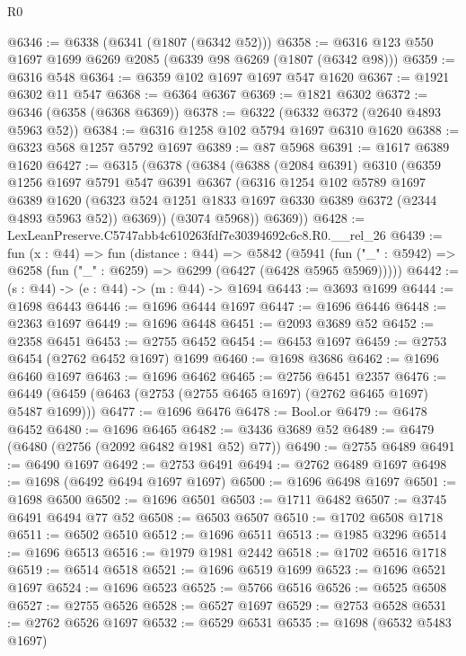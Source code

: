 \begin{lexlean}{R0}
\begin{coremodule}
@6346 := @6338 (@6341 (@1807 (@6342 @52)))
@6358 := @6316 @123 @550 @1697 @1699 @6269 @2085 (@6339 @98 @6269 (@1807 (@6342 @98)))
@6359 := @6316 @548
@6364 := @6359 @102 @1697 @1697 @547 @1620
@6367 := @1921 @6302 @11 @547
@6368 := @6364 @6367
@6369 := @1821 @6302
@6372 := @6346 (@6358 (@6368 @6369))
@6378 := @6322 (@6332 @6372 (@2640 @4893 @5963 @52))
@6384 := @6316 @1258 @102 @5794 @1697 @6310 @1620
@6388 := @6323 @568 @1257 @5792 @1697
@6389 := @87 @5968
@6391 := @1617 @6389 @1620
@6427 := @6315
    (@6378
      (@6384
        (@6388
          (@2084 @6391)
          @6310
          (@6359
            @1256
            @1697
            @5791
            @547
            @6391
            @6367
            (@6316
              @1254
              @102
              @5789
              @1697
              @6389
              @1620
              (@6323 @524 @1251 @1833 @1697 @6330 @6389 @6372 (@2344 @4893 @5963 @52))
              @6369))
          (@3074 @5968))
        @6369))
@6428 := LexLeanPreserve.C5747abb4c610263fdf7e30394692c6c8.R0.__rel_26
@6439 := fun (x : @44) =>
  fun (distance : @44) =>
  @5842
    (@5941 (fun ("_" : @5942) => @6258 (fun ("_" : @6259) => @6299 (@6427 (@6428 @5965 @5969)))))
@6442 := (s : @44) -> (e : @44) -> (m : @44) -> @1694
@6443 := @3693 @1699
@6444 := @1698 @6443
@6446 := @1696 @6444 @1697
@6447 := @1696 @6446
@6448 := @2363 @1697
@6449 := @1696 @6448
@6451 := @2093 @3689 @52
@6452 := @2358 @6451
@6453 := @2755 @6452
@6454 := @6453 @1697
@6459 := @2753 @6454 (@2762 @6452 @1697) @1699
@6460 := @1698 @3686
@6462 := @1696 @6460 @1697
@6463 := @1696 @6462
@6465 := @2756 @6451 @2357
@6476 := @6449 (@6459 (@6463 (@2753 (@2755 @6465 @1697) (@2762 @6465 @1697) @5487 @1699)))
@6477 := @1696 @6476
@6478 := Bool.or
@6479 := @6478 @6452
@6480 := @1696 @6465
@6482 := @3436 @3689 @52
@6489 := @6479 (@6480 (@2756 (@2092 @6482 @1981 @52) @77))
@6490 := @2755 @6489
@6491 := @6490 @1697
@6492 := @2753 @6491
@6494 := @2762 @6489 @1697
@6498 := @1698 (@6492 @6494 @1697 @1697)
@6500 := @1696 @6498 @1697
@6501 := @1698 @6500
@6502 := @1696 @6501
@6503 := @1711 @6482
@6507 := @3745 @6491 @6494 @77 @52
@6508 := @6503 @6507
@6510 := @1702 @6508 @1718
@6511 := @6502 @6510
@6512 := @1696 @6511
@6513 := @1985 @3296
@6514 := @1696 @6513
@6516 := @1979 @1981 @2442
@6518 := @1702 @6516 @1718
@6519 := @6514 @6518
@6521 := @1696 @6519 @1699
@6523 := @1696 @6521 @1697
@6524 := @1696 @6523
@6525 := @5766 @6516
@6526 := @6525 @6508
@6527 := @2755 @6526
@6528 := @6527 @1697
@6529 := @2753 @6528
@6531 := @2762 @6526 @1697
@6532 := @6529 @6531
@6535 := @1698 (@6532 @5483 @1697)

\end{coremodule}
\end{lexlean}
